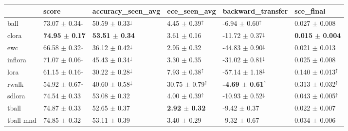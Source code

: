 \begin{tabular}{llllll}
\toprule
 & {\small score} & {\small accuracy\_seen\_avg} & {\small ece\_seen\_avg} & {\small backward\_transfer} & {\small sce\_final} \\
\midrule
ball & \small 73.07 $\pm$ 0.34$^{\downarrow}$ & \small 50.59 $\pm$ 0.33$^{\downarrow}$ & \small 4.45 $\pm$ 0.39$^{\uparrow}$ & \small -6.94 $\pm$ 0.60$^{\uparrow}$ & \small 0.027 $\pm$ 0.008 \\
clora & \small \textbf{74.95 $\pm$ 0.17} & \small \textbf{53.51 $\pm$ 0.34} & \small 3.61 $\pm$ 0.16 & \small -11.72 $\pm$ 0.37$^{\downarrow}$ & \small \textbf{0.015 $\pm$ 0.004} \\
ewc & \small 66.58 $\pm$ 0.32$^{\downarrow}$ & \small 36.12 $\pm$ 0.42$^{\downarrow}$ & \small 2.95 $\pm$ 0.32 & \small -44.83 $\pm$ 0.90$^{\downarrow}$ & \small 0.021 $\pm$ 0.013 \\
inflora & \small 71.07 $\pm$ 0.06$^{\downarrow}$ & \small 45.43 $\pm$ 0.34$^{\downarrow}$ & \small 3.30 $\pm$ 0.35 & \small -31.02 $\pm$ 0.81$^{\downarrow}$ & \small 0.025 $\pm$ 0.008 \\
lora & \small 61.15 $\pm$ 0.16$^{\downarrow}$ & \small 30.22 $\pm$ 0.28$^{\downarrow}$ & \small 7.93 $\pm$ 0.38$^{\uparrow}$ & \small -57.14 $\pm$ 1.18$^{\downarrow}$ & \small 0.140 $\pm$ 0.013$^{\uparrow}$ \\
rwalk & \small 54.92 $\pm$ 0.67$^{\downarrow}$ & \small 40.60 $\pm$ 0.58$^{\downarrow}$ & \small 30.75 $\pm$ 0.79$^{\uparrow}$ & \small \textbf{-4.69 $\pm$ 0.61}$^{\uparrow}$ & \small 0.313 $\pm$ 0.032$^{\uparrow}$ \\
sdlora & \small 74.54 $\pm$ 0.33 & \small 53.08 $\pm$ 0.32 & \small 4.00 $\pm$ 0.39$^{\uparrow}$ & \small -10.93 $\pm$ 0.52$^{\downarrow}$ & \small 0.043 $\pm$ 0.005$^{\uparrow}$ \\
tball & \small 74.87 $\pm$ 0.33 & \small 52.65 $\pm$ 0.37 & \small \textbf{2.92 $\pm$ 0.32} & \small -9.42 $\pm$ 0.37 & \small 0.022 $\pm$ 0.007 \\
tball-mnd & \small 74.85 $\pm$ 0.32 & \small 53.11 $\pm$ 0.39 & \small 3.40 $\pm$ 0.29 & \small -9.32 $\pm$ 0.67 & \small 0.034 $\pm$ 0.006 \\
\bottomrule
\end{tabular}
